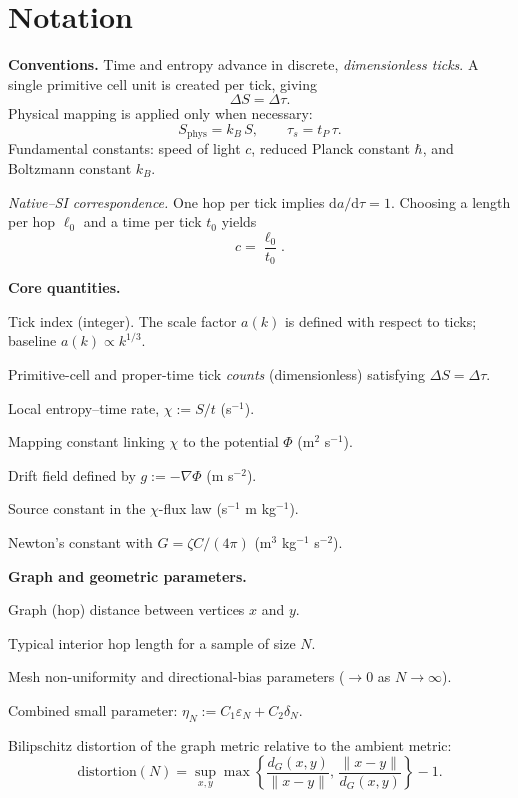\section*{Notation}

\noindent\textbf{Conventions.}  
Time and entropy advance in discrete, \emph{dimensionless ticks}.   
A single primitive cell unit is created per tick, giving
\[
  \Delta S = \Delta \tau.
\]
Physical mapping is applied only when necessary:
\[
  S_{\mathrm{phys}} = k_B\,S, \qquad
  \tau_s = t_P\,\tau.
\]
Fundamental constants: speed of light \(c\), reduced Planck constant \(\hbar\), and Boltzmann constant \(k_B\).

\smallskip
\noindent\textit{Native--SI correspondence.}  
One hop per tick implies \(\mathrm{d}a/\mathrm{d}\tau = 1\).  
Choosing a length per hop \(\ell_0\) and a time per tick \(t_0\) yields
\[
  c = \frac{\ell_0}{t_0}.
\]

\bigskip
\noindent\textbf{Core quantities.}
\begin{description}[leftmargin=2.4em,labelsep=0.8em]
  \item[\(k\)] Tick index (integer). The scale factor \(a(k)\) is defined with respect to ticks; baseline \(a(k)\propto k^{1/3}\).
  \item[\(\Delta S,\,\Delta\tau\)] Primitive-cell and proper-time tick \emph{counts} (dimensionless) satisfying \(\Delta S=\Delta\tau\).
  \item[\(\chi\)] Local entropy–time rate, \(\chi := S/t\) (s\(^{-1}\)).
  \item[\(\zeta\)] Mapping constant linking \(\chi\) to the potential \(\Phi\) (m\(^2\) s\(^{-1}\)).
  \item[\(g\)] Drift field defined by \(g:=-\nabla\Phi\) (m s\(^{-2}\)).
  \item[\(C\)] Source constant in the \(\chi\)-flux law (s\(^{-1}\) m kg\(^{-1}\)).
  \item[\(G\)] Newton’s constant with \(G = \zeta C / (4\pi)\) (m\(^3\) kg\(^{-1}\) s\(^{-2}\)).
\end{description}

\noindent\textbf{Graph and geometric parameters.}
\begin{description}[leftmargin=2.4em,labelsep=0.8em]
  \item[\(d_G(x,y)\)] Graph (hop) distance between vertices \(x\) and \(y\).
  \item[\(\ell_N\)] Typical interior hop length for a sample of size \(N\).
  \item[\(\varepsilon_N,\,\delta_N\)] Mesh non-uniformity and directional-bias parameters (\(\to 0\) as \(N\to\infty\)).
  \item[\(\eta_N\)] Combined small parameter: \(\eta_N := C_1\varepsilon_N + C_2\delta_N.\)
  \item[\(\mathrm{distortion}(N)\)] Bilipschitz distortion of the graph metric relative to the ambient metric:
  \[
    \mathrm{distortion}(N)
      = \sup_{x,y}
        \max\!\left\{
          \frac{d_G(x,y)}{\|x-y\|},\,
          \frac{\|x-y\|}{d_G(x,y)}
        \right\}-1.
  \]
\end{description}

